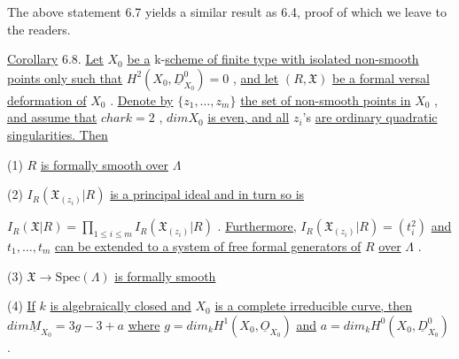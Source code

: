The above statement 6.7 yields a similar result as 6.4, proof of which we leave to the readers.

\underline{Corollary} 6.8.  \underline{Let}  $X_0$  \underline{be a} k-\underline{scheme of finite type with isolated non-smooth points only such that}  $H^2(X_0, \underline{D}^0_{X_0}) = 0$  , \underline{and let}  $(R, \mathfrak{X})$  \underline{be a formal versal deformation of}  $X_0$  . \underline{Denote by}  $\{z_1, \ldots, z_m\}$  \underline{the set of non-smooth points in} $X_0$  , \underline{and assume that}  $char k = 2$  , $dim X_0$  \underline{is even, and all}  $z_i$'s  \underline{are ordinary quadratic singularities. Then}

(1)  $R$  \underline{is formally smooth over}  $\Lambda$

(2)  $I_R(\mathfrak{X}_{(z_i)}|R)$  \underline{is a principal ideal and in turn so is}

$I_R(\mathfrak{X}|R) = \prod_{1 \leq i \leq m} I_R(\mathfrak{X}_{(z_i)}|R)$  . \underline{Furthermore,}  $I_R(\mathfrak{X}_{(z_i)}|R) = (t_i^2)$  \underline{and} $t_1, \ldots , t_m$  \underline{can be extended to a system of free formal generators of}  $R$  \underline{over} $\Lambda$  .

(3)  $\mathfrak{X} \to \mathrm{Spec}(\Lambda)$  \underline{is formally smooth}

(4)  \underline{If}  $k$  \underline{is algebraically closed and}  $X_0$  \underline{is a complete irreducible curve, then}  $dim \underline{M}_{X_0} = 3g - 3 + a$  \underline{where}  $g = dim_k H^1(X_0, \underline{O}_{X_0})$  \underline{and} $a = dim_k H^0(X_0, \underline{D}^0_{X_0})$  .
